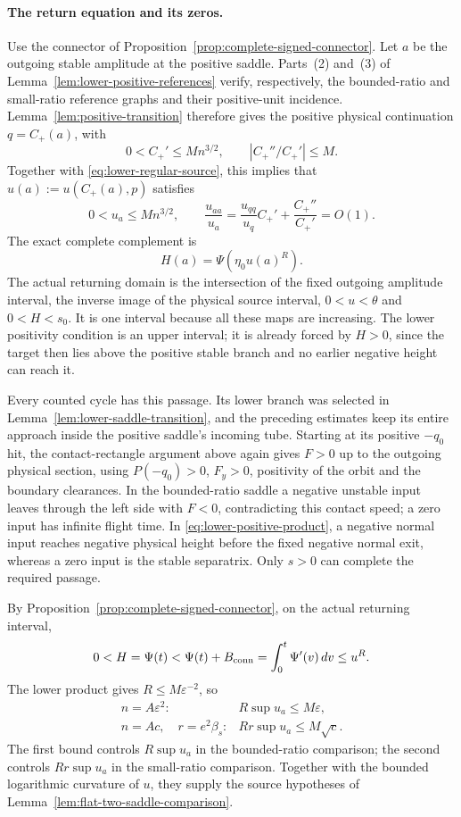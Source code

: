 \paragraph{The return equation and its zeros.}
Use the connector of Proposition~\ref{prop:complete-signed-connector}.
Let $a$ be the outgoing stable amplitude at the positive saddle.
Parts~(2) and~(3) of Lemma~\ref{lem:lower-positive-references} verify,
respectively, the bounded-ratio and small-ratio reference graphs and
their positive-unit incidence.  Lemma~\ref{lem:positive-transition}
therefore gives the positive physical
continuation $q=C_+(a)$, with
\[
 0<C_+'\le Mn^{3/2},\qquad
 |C_+''/C_+'|\le M.
\]
Together with \eqref{eq:lower-regular-source}, this implies that
$u(a):=u(C_+(a),p)$ satisfies
\[
 0<u_a\le Mn^{3/2},\qquad
 \frac{u_{aa}}{u_a}
 =\frac{u_{qq}}{u_q}C_+'+\frac{C_+''}{C_+'}=O(1).
\]
The exact complete complement is
\begin{equation}\label{eq:lower-complete-middle}
 H(a)=\Psi(\eta_0u(a)^R).
\end{equation}
The actual returning domain is the intersection of the fixed outgoing
amplitude interval, the inverse image of the physical source interval,
$0<u<\theta$ and $0<H<s_0$. It is one interval because all these maps
are increasing. The lower positivity condition is an upper interval;
it is already forced by $H>0$, since the target then lies above the
positive stable branch and no earlier negative height can reach it.

Every counted cycle has this passage. Its lower branch was selected in
Lemma~\ref{lem:lower-saddle-transition}, and the preceding estimates
keep its entire approach inside the positive saddle's incoming tube.
Starting at its positive $-q_0$ hit, the contact-rectangle argument above
again gives $F>0$ up to the outgoing physical section, using
$P(-q_0)>0$, $F_y>0$, positivity of the orbit and the boundary
clearances.
In the bounded-ratio saddle a negative unstable input leaves through the
left side with $F<0$, contradicting this contact speed; a zero input has
infinite flight time. In
\eqref{eq:lower-positive-product}, a negative normal input reaches
negative physical height before the fixed negative normal exit, whereas
a zero input is the stable separatrix. Only $s>0$ can complete the
required passage.

By Proposition~\ref{prop:complete-signed-connector}, on the actual
returning interval,
\[
 0<H=\Psi(t)<\Psi(t)+B_{\rm conn}
       =\int_0^t\Psi'(v)\,dv\le u^R.
\]
The lower product gives $R\le M\varepsilon^{-2}$, so
\[
 \begin{array}{ll}
 n=A\varepsilon^2:& R\sup u_a\le M\varepsilon,\\
 n=Ac,\quad r=e^2\beta_s:& Rr\sup u_a\le M\sqrt c.
 \end{array}
\]
The first bound controls $R\sup u_a$ in the bounded-ratio comparison;
the second controls $Rr\sup u_a$ in the small-ratio comparison. Together
with the bounded logarithmic curvature of $u$, they supply the source
hypotheses of Lemma~\ref{lem:flat-two-saddle-comparison}.

